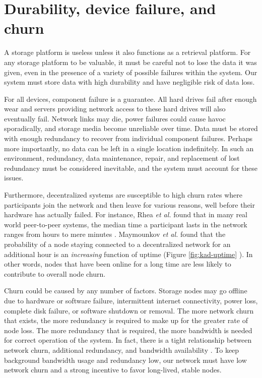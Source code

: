 \documentclass[8pt,fleqn,openany]{book}
\begin{document}
\section{Durability, device failure, and churn}\label{sec:constraint-churn}

A storage platform is useless unless it also functions as a retrieval platform.
For any storage platform to be valuable, it must be careful not to lose the
data it was given, even in the presence of a variety of possible failures within
the system. Our system must store data with high durability and have negligible
risk of data loss.

For all devices, component failure is a guarantee.
All hard drives fail after enough wear
\cite{backblaze-hd-2018-q1} and servers providing network access to
these hard drives will also eventually fail. Network links may die, power
failures could cause havoc sporadically,
and storage media become unreliable over time.
Data must be stored with enough redundancy to recover from
individual component failures.
Perhaps more importantly, no data can be left in a single location
indefinitely. In such an environment, redundancy, data
maintenance, repair, and replacement of lost redundancy must be considered
inevitable, and the system must account for these issues.

Furthermore, decentralized systems are susceptible to high churn rates
where participants join the network and then leave for
various reasons, well before their hardware has actually failed.
For instance, Rhea {\em et al.} found that in many real world peer-to-peer
systems, the median time a participant lasts in the network ranges from hours
to mere minutes \cite{dht-churn}.
Maymounkov {\em et al.} found that the probability of a node staying connected
to a decentralized network for an additional hour is an {\em increasing}
function of uptime (Figure \ref{fig:kad-uptime} \cite{kad}).
In other words, nodes that have been online for a long time are less likely
to contribute to overall node churn.

Churn could be caused by any number of factors. Storage nodes
may go offline due to hardware or software failure, intermittent internet
connectivity, power loss, complete disk failure, or software shutdown or
removal. The more
network churn that exists, the more redundancy is required to make up for
the greater rate of node loss. The more redundancy that is required, the more
bandwidth is needed for correct operation of the system. In fact, there is
a tight relationship between network churn, additional redundancy,
and bandwidth availability \cite{pick2-churn}. To
keep background bandwidth usage and redundancy low, our network must have
low network churn and a strong incentive to favor long-lived, stable
nodes.
\end{document}
